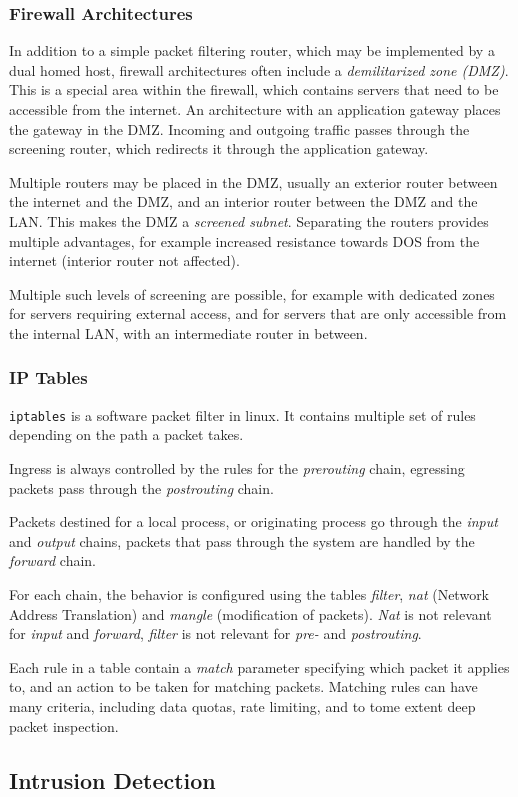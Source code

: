 \subsubsection{Firewall Architectures}
In addition to a simple packet filtering router, which may be implemented by a
dual homed host, firewall architectures often include a \emph{demilitarized zone
(DMZ)}. This is a special area within the firewall, which contains servers that
need to be accessible from the internet. An architecture with an application
gateway places the gateway in the DMZ. Incoming and outgoing traffic passes
through the screening router, which redirects it through the application
gateway. 

Multiple routers may be placed in the DMZ, usually an exterior router
between the internet and the DMZ, and an interior router between the DMZ and the
LAN. This makes the DMZ a \textit{screened subnet}. Separating the routers
provides multiple advantages, for example increased resistance towards DOS from
the internet (interior router not affected).

Multiple such levels of screening are possible, for example with dedicated zones
for servers requiring external access, and for servers that are only accessible
from the internal LAN, with an intermediate router in between.

\subsubsection{IP Tables}
\texttt{iptables} is a software packet filter in linux. It contains multiple set
of rules depending on the path a packet takes.

Ingress is always controlled by the rules for the \textit{prerouting} chain,
egressing packets pass through the \textit{postrouting} chain.

Packets destined for a local process, or originating process go through the
\textit{input} and \textit{output} chains, packets that pass through the system
are handled by the \textit{forward} chain.

For each chain, the behavior is configured using the tables \textit{filter},
\textit{nat} (Network Address Translation) and \textit{mangle} (modification of
packets). \textit{Nat} is not relevant for \textit{input} and \textit{forward},
\textit{filter} is not relevant for \textit{pre-} and \textit{postrouting}.

Each rule in a table contain a \textit{match} parameter specifying which packet
it applies to, and an action to be taken for matching packets. Matching rules
can have many criteria, including data quotas, rate limiting, and to tome extent
deep packet inspection.

\subsection{Intrusion Detection}
